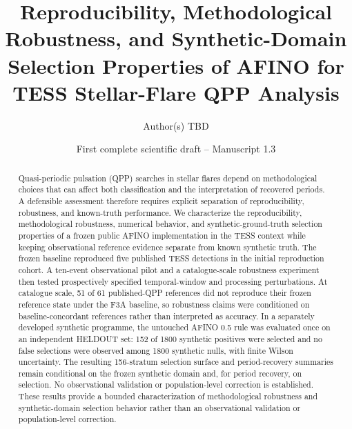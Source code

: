 \documentclass[11pt,a4paper]{article}
\title{Reproducibility, Methodological Robustness, and Synthetic-Domain Selection Properties of AFINO for TESS Stellar-Flare QPP Analysis}
\author{Author(s) TBD}
\date{First complete scientific draft -- Manuscript 1.3}
\begin{document}
\maketitle
\begin{abstract}
Quasi-periodic pulsation (QPP) searches in stellar flares depend on methodological choices that can affect both classification and the interpretation of recovered periods. A defensible assessment therefore requires explicit separation of reproducibility, robustness, and known-truth performance. We characterize the reproducibility, methodological robustness, numerical behavior, and synthetic-ground-truth selection properties of a frozen public AFINO implementation in the TESS context while keeping observational reference evidence separate from known synthetic truth. The frozen baseline reproduced five published TESS detections in the initial reproduction cohort. A ten-event observational pilot and a catalogue-scale robustness experiment then tested prospectively specified temporal-window and processing perturbations. At catalogue scale, 51 of 61 published-QPP references did not reproduce their frozen reference state under the F3A baseline, so robustness claims were conditioned on baseline-concordant references rather than interpreted as accuracy. In a separately developed synthetic programme, the untouched AFINO 0.5 rule was evaluated once on an independent HELDOUT set: 152 of 1800 synthetic positives were selected and no false selections were observed among 1800 synthetic nulls, with finite Wilson uncertainty. The resulting 156-stratum selection surface and period-recovery summaries remain conditional on the frozen synthetic domain and, for period recovery, on selection. No observational validation or population-level correction is established. These results provide a bounded characterization of methodological robustness and synthetic-domain selection behavior rather than an observational validation or population-level correction.
\end{abstract}
\end{document}
